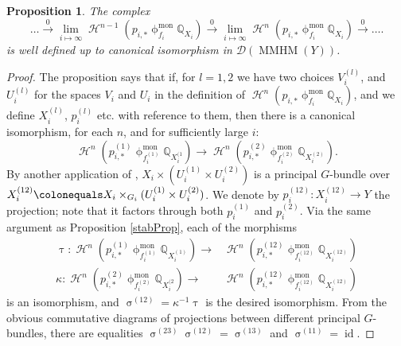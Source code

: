 \documentclass[a4paper,10pt]{amsart}
\renewcommand{\sigma}{\upsigma}
\renewcommand{\phi}{\upphi}
\renewcommand{\tau}{\uptau}
\newtheorem{proposition}[theorem]{Proposition}
\newcommand{\phim}[1]{\phi^{\mon}_{#1}}
\DeclareMathOperator{\mon}{mon}
\DeclareMathOperator{\MMHM}{MMHM}
\DeclareMathOperator{\id}{id}
\DeclareMathOperator{\Ho}{\mathcal{H}}
\newcommand{\Dub}{\mathcal{D}}
\begin{document}
\begin{proposition}
\label{Hpprop}
The complex
\begin{equation}
\label{Hpdef}
\ldots\xrightarrow{0}\lim_{i\mapsto\infty}\Ho^{n-1}(p_{i,*}\phim{f_i}\mathbb{Q}_{X_i})\xrightarrow{0}\lim_{i\mapsto\infty}\Ho^{n}(p_{i,*}\phim{f_i}\mathbb{Q}_{X_i})\xrightarrow{0}\ldots.
\end{equation}
is well defined up to canonical isomorphism in $\Dub(\MMHM(Y))$.
\end{proposition}
\begin{proof}
The proposition says that if, for $l=1,2$ we have two choices $V^{(l)}_i$, and $U^{(l)}_i$ for the spaces $V_i$ and $U_i$ in the definition of $\Ho^n(p_{i,*}\phim{f_i}\mathbb{Q}_{X_i})$, and we define $X^{(l)}_i$, $p^{(l)}_i$ etc. with reference to them, then there is a canonical isomorphism, for each $n$, and for sufficiently large $i$:
\[
\Ho^n(p^{(1)}_{i,*}\phim{f^{(1)}_i}\mathbb{Q}_{X^{(1}_i})\rightarrow\Ho^n(p^{(2)}_{i,*}\phim{f^{(2)}_i}\mathbb{Q}_{X^{(2)}_i}).
\]
By another application of \cite[Prop.23]{EdGr98}, $X_i\times (U^{(1)}_i\times U^{(2)}_i)$ is a principal $G$-bundle over $X_i^{(12)}\colonequals X_i\times_{G_i}(U^{(1)}_i\times U^{(2)}_i)$.  We denote by $p^{(12)}_i\colon X_i^{(12)}\rightarrow Y$ the projection; note that it factors through both $p^{(1)}_i$ and $p^{(2)}_i$.  Via the same argument as Proposition \ref{stabProp}, each of the morphisms
\begin{align*}
\tau\colon\Ho^n(p^{(1)}_{i,*}\phim{f^{(1)}_i}\mathbb{Q}_{X^{(1)}_i})\rightarrow &\Ho^n(p^{(12)}_{i,*}\phim{f^{(12)}_i}\mathbb{Q}_{X^{(12)}_i})\\
\kappa\colon\Ho^n(p^{(2)}_{i,*}\phim{f^{(2)}_i}\mathbb{Q}_{X^{(2}_i})\rightarrow &\Ho^n(p^{(12)}_{i,*}\phim{f^{(12)}_i}\mathbb{Q}_{X^{(12)}_i})
\end{align*}
is an isomorphism, and $\sigma^{(12)}=\kappa^{-1}\tau$ is the desired isomorphism.  From the obvious commutative diagrams of projections between different principal $G$-bundles, there are equalities $\sigma^{(23)}\sigma^{(12)}=\sigma^{(13)}$ and $\sigma^{(11)}=\id$.
\end{proof}
\end{document}
